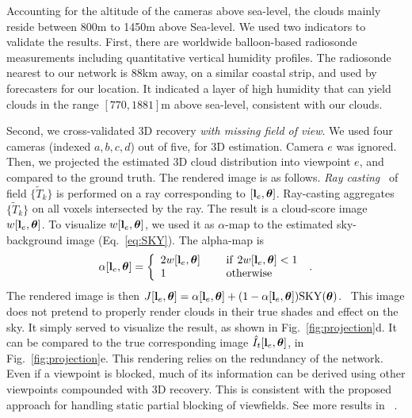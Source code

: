 \documentclass[runningheads]{llncs}
\begin{document}
Accounting for the altitude of the cameras above sea-level, the clouds mainly reside between 800m to 1450m above Sea-level. We used two indicators to validate the results. First, there are worldwide balloon-based radiosonde measurements including quantitative vertical humidity profiles. The radiosonde nearest to our network is 88km away, on a similar coastal strip, and used by forecasters for our location. It indicated a layer of high humidity that can yield clouds in the range $[770,1881]$m above sea-level, consistent with our clouds.

Second, we cross-validated 3D recovery {\em with missing field of view}. We used four cameras (indexed $a,b,c,d$) out of five, for 3D estimation. Camera $e$ was ignored. Then, we projected the estimated 3D cloud distribution into viewpoint $e$, and compared to the ground truth. The rendered image is as follows. {\em Ray casting}~\cite{Levoy1990} of  field $\{\tilde T_k\}$ is performed on a ray corresponding to
$[{\bf l}_e,{\bm \theta}]$. Ray-casting aggregates $\{\tilde T_k\}$ on all voxels intersected by the ray. The result is a cloud-score image $w[{\bf l}_e,{\bm \theta}]$.
To visualize $w[{\bf l}_e,{\bm \theta}]$, we used it as $\alpha$-map to the estimated sky-background image (Eq.~\ref{eq:SKY}). The alpha-map is
\begin{equation}
 \alpha[{\bf l}_e,{\bm \theta}]=\left\{
      \begin{array}{ll}
      2w[{\bf l}_e,{\bm \theta}]
      & ~~~~{\rm if}~ 2w[{\bf l}_e,{\bm \theta}]<1 \\
      1
      & ~~~~{\rm otherwise}
      \end{array}
      \right.
  \;.
 \label{eq:alpha}
\end{equation}
The rendered image is then
 $J[{\bf l}_e,{\bm \theta}]=
 \alpha[{\bf l}_e,{\bm \theta}]+(1-\alpha[{\bf l}_e,{\bm \theta}]){\rm SKY}({\bm \theta})$.~
This image does not pretend to properly render clouds in their true shades and effect on the sky. It simply served to visualize the result, as shown in Fig.~\ref{fig:projection}d. It can be compared to the true corresponding image $\hat I_t[{\bf l}_e,{\bm \theta}]$, in Fig.~\ref{fig:projection}e.
This rendering relies on the redundancy of the network. Even if a viewpoint is blocked, much of its information can be derived using other viewpoints compounded with 3D recovery. This is consistent with the proposed approach for handling static partial blocking of viewfields. See more results in ~\cite{Supp2014}.
\end{document}
